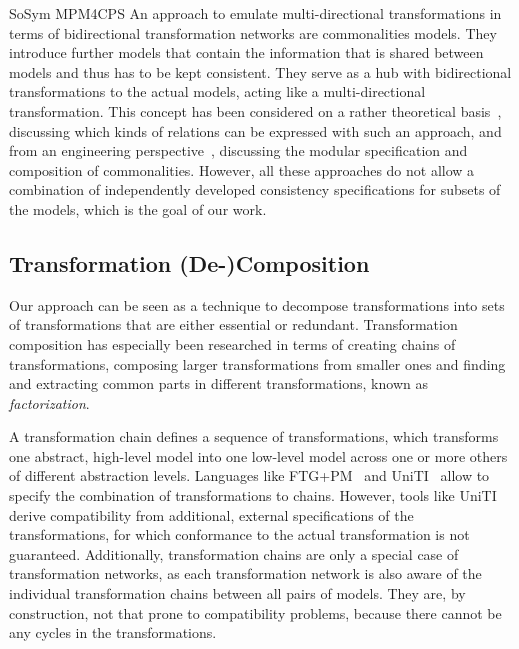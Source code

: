\begin{copiedFrom}{SoSym MPM4CPS}
An approach to emulate multi-directional transformations in terms of bidirectional transformation networks are commonalities models. 
They introduce further models that contain the information that is shared between models and thus has to be kept consistent.
They serve as a hub with bidirectional transformations to the actual models, acting like a multi-directional transformation.
This concept has been considered on a rather theoretical basis~\cite{stunkel2018MultimodelCorrespondence-ICPS, diskin2018MultiModelSynchronization-FASE}, discussing which kinds of relations can be expressed with such an approach, and from an engineering perspective~\cite{klare2019models}, discussing the modular specification and composition of commonalities.
However, all these approaches do not allow a combination of independently developed consistency specifications for subsets of the models, which is the goal of our work.


\subsection*{Transformation (De-)Composition}
Our approach can be seen as a technique to decompose transformations into sets of transformations that are either essential or redundant.
Transformation composition has especially been researched in terms of creating chains of transformations, composing larger transformations from smaller ones and finding and extracting common parts in different transformations, known as \emph{factorization}.

A transformation chain defines a sequence of transformations, which transforms one abstract, high-level model into one low-level model across one or more others of different abstraction levels.
Languages like FTG+PM~\cite{lucio2013FTGPM-SDL} and UniTI~\cite{%
vanhooff2007UniTI-MODELS}
allow to specify the combination of transformations to chains.
However, tools like UniTI derive compatibility from additional, external specifications of the transformations, for which conformance to the actual transformation is not guaranteed.
Additionally, transformation chains are only a special case of transformation networks, as each transformation network is also aware of the individual transformation chains between all pairs of models.
They are, by construction, not that prone to compatibility problems, because there cannot be any cycles in the transformations.


\end{copiedFrom}
